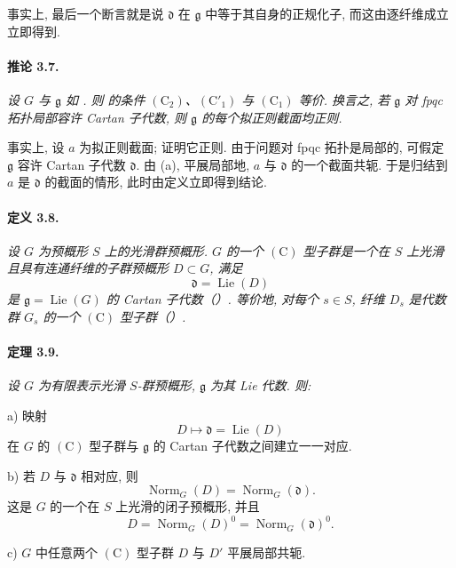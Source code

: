 事实上, 最后一个断言就是说 \(\mathfrak d\) 在 \(\mathfrak g\) 中等于其自身的正规化子, 而这由逐纤维成立立即得到.

\paragraph{\textbf{推论 3.7.}}
{\itshape 设 \(G\) 与 \(\mathfrak g\) 如 . 则  的条件 \((\mathrm C_2)\)、\((\mathrm C'_1)\) 与 \((\mathrm C_1)\) 等价. 换言之, 若 \(\mathfrak g\) 对 fpqc 拓扑局部容许 Cartan 子代数, 则 \(\mathfrak g\) 的每个拟正则截面均正则.}

事实上, 设 \(a\) 为拟正则截面; 证明它正则. 由于问题对 fpqc 拓扑是局部的, 可假定 \(\mathfrak g\) 容许 Cartan 子代数 \(\mathfrak d\). 由 \textup{(a)}, 平展局部地, \(a\) 与 \(\mathfrak d\) 的一个截面共轭. 于是归结到 \(a\) 是 \(\mathfrak d\) 的截面的情形, 此时由定义立即得到结论.

\paragraph{\textbf{定义 3.8.}}
{\itshape 设 \(G\) 为预概形 \(S\) 上的光滑群预概形. \(G\) 的一个 \emph{\((\mathrm C)\) 型子群}是一个在 \(S\) 上光滑且具有连通纤维的子群预概形 \(D\subset G\), 满足
\[
  \mathfrak d=\operatorname{Lie}(D)
\]
是 \(\mathfrak g=\operatorname{Lie}(G)\) 的 Cartan 子代数\textup{（）}. 等价地, 对每个 \(s\in S\), 纤维 \(D_s\) 是代数群 \(G_s\) 的一个 \((\mathrm C)\) 型子群\textup{（）}.}



\paragraph{\textbf{定理 3.9.}}
{\itshape 设 \(G\) 为有限表示光滑 \(S\)-群预概形, \(\mathfrak g\) 为其 Lie 代数. 则:

\smallskip
\noindent
\textup{a)}
映射
\[
  D\longmapsto\mathfrak d=\operatorname{Lie}(D)
\]
在 \(G\) 的 \((\mathrm C)\) 型子群与 \(\mathfrak g\) 的 Cartan 子代数之间建立一一对应.

\smallskip
\noindent
\textup{b)}
若 \(D\) 与 \(\mathfrak d\) 相对应, 则
\[
  \operatorname{Norm}_G(D)=\operatorname{Norm}_G(\mathfrak d).
\]
这是 \(G\) 的一个在 \(S\) 上光滑的闭子预概形, 并且
\[
  D=\operatorname{Norm}_G(D)^0
   =\operatorname{Norm}_G(\mathfrak d)^0.
\]

\smallskip
\noindent
\textup{c)}
\(G\) 中任意两个 \((\mathrm C)\) 型子群 \(D\) 与 \(D'\) 平展局部共轭.}

